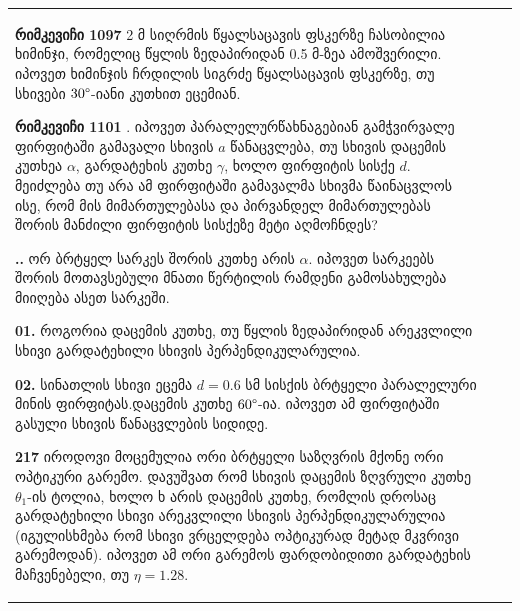 \documentclass{book}
\begin{document}
\begin{tabular}{|l|c|c|}
\textbf{რიმკევიჩი 1097} 2 მ სიღრმის წყალსაცავის ფსკერზე ჩასობილია ხიმინჯი, რომელიც წყლის ზედაპირიდან 0.5 მ-ზეა ამოშვერილი. იპოვეთ ხიმინჯის ჩრდილის სიგრძე წყალსაცავის ფსკერზე, თუ სხივები $30 \degree$-იანი კუთხით ეცემიან.

\textbf{რიმკევიჩი 1101} . იპოვეთ პარალელურწახნაგებიან გამჭვირვალე ფირფიტაში გამავალი სხივის $a$ წანაცვლება, თუ სხივის დაცემის კუთხეა $\alpha$, გარდატეხის კუთხე $\gamma$, ხოლო ფირფიტის სისქე $d$. მეიძლება თუ არა ამ ფირფიტაში გამავალმა სხივმა წაინაცვლოს ისე, რომ მის მიმართულებასა და პირვანდელ მიმართულებას შორის მანძილი ფირფიტის სისქეზე მეტი აღმოჩნდეს?

\textbf{..} 
ორ ბრტყელ სარკეს შორის კუთხე არის $\alpha$. იპოვეთ სარკეებს შორის მოთავსებული მნათი წერტილის რამდენი გამოსახულება მიიღება ასეთ სარკეში.

\textbf{01.}
როგორია დაცემის კუთხე, თუ წყლის ზედაპირიდან არეკვლილი სხივი გარდატეხილი სხივის პერპენდიკულარულია.

\textbf{02.}
სინათლის სხივი ეცემა $d = 0.6$ სმ სისქის ბრტყელი პარალელური მინის ფირფიტას.დაცემის კუთხე $60 \degree$-ია. იპოვეთ ამ ფირფიტაში გასული სხივის წანაცვლების სიდიდე.

\textbf{217}
იროდოვი 
მოცემულია ორი ბრტყელი საზღვრის მქონე ორი ოპტიკური გარემო. დავუშვათ რომ სხივის დაცემის ზღვრული კუთხე $\theta_1$-ის ტოლია, ხოლო ხ არის დაცემის კუთხე, რომლის დროსაც გარდატეხილი სხივი არეკვლილი სხივის პერპენდიკულარულია (იგულისხმება რომ სხივი ვრცელდება ოპტიკურად მეტად მკვრივი გარემოდან). იპოვეთ ამ ორი გარემოს ფარდობიდითი გარდატეხის მაჩვენებელი, თუ $\eta = 1.28$.


\end{tabular}
\end{document}
